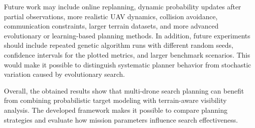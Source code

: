 \documentclass[english]{projectreport}
\begin{document}
Future work may include online replanning, dynamic probability updates after
partial observations, more realistic UAV dynamics, collision avoidance,
communication constraints, larger terrain datasets, and more advanced
evolutionary or learning-based planning methods. In addition, future
experiments should include repeated genetic algorithm runs with different
random seeds, confidence intervals for the plotted metrics, and larger
benchmark scenarios. This would make it possible to distinguish systematic
planner behavior from stochastic variation caused by evolutionary search.

Overall, the obtained results show that multi-drone search planning can benefit
from combining probabilistic target modeling with terrain-aware visibility
analysis. The developed framework makes it possible to compare planning
strategies and evaluate how mission parameters influence search effectiveness.


\printbibliography

\end{document}
